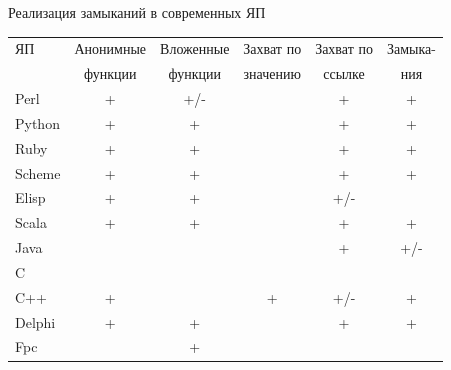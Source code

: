 \documentclass[roman,12pt]{beamer}
\newenvironment{changemargin}[2]{%
  \begin{list}{}{%
    \setlength{\topsep}{0pt}%
    \setlength{\leftmargin}{#1}%
    \setlength{\rightmargin}{#2}%
    \setlength{\listparindent}{\parindent}%
    \setlength{\itemindent}{\parindent}%
    \setlength{\parsep}{\parskip}%
  }%
  \item[]}{\end{list}}
\newcommand\Fontvi{\fontsize{11}{14}\selectfont}
\begin{document}
\begin{frame}{Реализация замыканий в современных ЯП}
\Fontvi
\begin{changemargin}{-1cm}{0cm} 

\begin{table}[h!]
\begin{center}
\begin{tabular}{|l|c|c|c|c|c|}
\hline
  ЯП     &  Анонимные  &  Вложенные  &  Захват по  &  Захват по  & Замыка- \\
         &  функции    &  функции    &  значению   &  ссылке     & ния     \\
\hline
 Perl    &  +          &  +/-        &             &  +          &  +          \\
\hline
 Python  &  +          &  +          &             &  +          &  +          \\
\hline
 Ruby    &  +          &  +          &             &  +          &  +          \\
\hline
 Scheme  &  +          &  +          &             &  +          &  +          \\
\hline
 Elisp   &  +          &  +          &             &  +/-        &             \\
\hline
 Scala   &  +          &  +          &             &  +          &  +          \\
\hline
 Java    &             &             &             &  +          &  +/-        \\
\hline
 C       &             &             &             &             &             \\
\hline
 C++     &  +          &             &  +          &  +/-        &  +          \\
\hline
 Delphi  &  +          &  +          &             &  +          &  +          \\
\hline
 Fpc     &             &  +          &             &             &             \\
\hline
\end{tabular}
\end{center}
\end{table}

\end{changemargin}

\end{frame}
\end{document}
